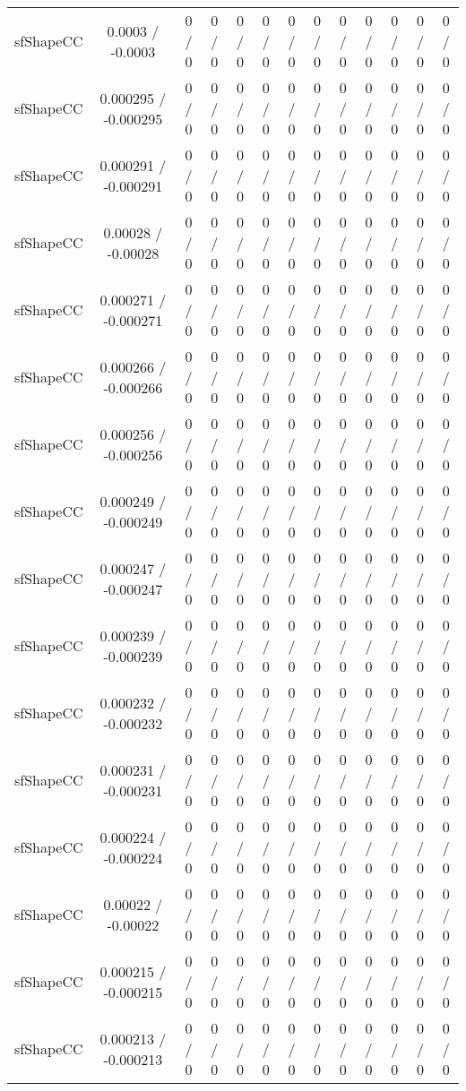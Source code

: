 \documentclass[10pt]{article}
\begin{document}
\begin{table}[htbp]
\begin{center}
\begin{tabular}{|c|c|c|c|c|c|c|c|c|c|c|c|c|}
  sfShapeCC & 0.0003 / -0.0003 & 0 / 0 & 0 / 0 & 0 / 0 & 0 / 0 & 0 / 0 & 0 / 0 & 0 / 0 & 0 / 0 & 0 / 0 & 0 / 0 & 0 / 0 \\ 
  sfShapeCC & 0.000295 / -0.000295 & 0 / 0 & 0 / 0 & 0 / 0 & 0 / 0 & 0 / 0 & 0 / 0 & 0 / 0 & 0 / 0 & 0 / 0 & 0 / 0 & 0 / 0 \\ 
  sfShapeCC & 0.000291 / -0.000291 & 0 / 0 & 0 / 0 & 0 / 0 & 0 / 0 & 0 / 0 & 0 / 0 & 0 / 0 & 0 / 0 & 0 / 0 & 0 / 0 & 0 / 0 \\ 
  sfShapeCC & 0.00028 / -0.00028 & 0 / 0 & 0 / 0 & 0 / 0 & 0 / 0 & 0 / 0 & 0 / 0 & 0 / 0 & 0 / 0 & 0 / 0 & 0 / 0 & 0 / 0 \\ 
  sfShapeCC & 0.000271 / -0.000271 & 0 / 0 & 0 / 0 & 0 / 0 & 0 / 0 & 0 / 0 & 0 / 0 & 0 / 0 & 0 / 0 & 0 / 0 & 0 / 0 & 0 / 0 \\ 
  sfShapeCC & 0.000266 / -0.000266 & 0 / 0 & 0 / 0 & 0 / 0 & 0 / 0 & 0 / 0 & 0 / 0 & 0 / 0 & 0 / 0 & 0 / 0 & 0 / 0 & 0 / 0 \\ 
  sfShapeCC & 0.000256 / -0.000256 & 0 / 0 & 0 / 0 & 0 / 0 & 0 / 0 & 0 / 0 & 0 / 0 & 0 / 0 & 0 / 0 & 0 / 0 & 0 / 0 & 0 / 0 \\ 
  sfShapeCC & 0.000249 / -0.000249 & 0 / 0 & 0 / 0 & 0 / 0 & 0 / 0 & 0 / 0 & 0 / 0 & 0 / 0 & 0 / 0 & 0 / 0 & 0 / 0 & 0 / 0 \\ 
  sfShapeCC & 0.000247 / -0.000247 & 0 / 0 & 0 / 0 & 0 / 0 & 0 / 0 & 0 / 0 & 0 / 0 & 0 / 0 & 0 / 0 & 0 / 0 & 0 / 0 & 0 / 0 \\ 
  sfShapeCC & 0.000239 / -0.000239 & 0 / 0 & 0 / 0 & 0 / 0 & 0 / 0 & 0 / 0 & 0 / 0 & 0 / 0 & 0 / 0 & 0 / 0 & 0 / 0 & 0 / 0 \\ 
  sfShapeCC & 0.000232 / -0.000232 & 0 / 0 & 0 / 0 & 0 / 0 & 0 / 0 & 0 / 0 & 0 / 0 & 0 / 0 & 0 / 0 & 0 / 0 & 0 / 0 & 0 / 0 \\ 
  sfShapeCC & 0.000231 / -0.000231 & 0 / 0 & 0 / 0 & 0 / 0 & 0 / 0 & 0 / 0 & 0 / 0 & 0 / 0 & 0 / 0 & 0 / 0 & 0 / 0 & 0 / 0 \\ 
  sfShapeCC & 0.000224 / -0.000224 & 0 / 0 & 0 / 0 & 0 / 0 & 0 / 0 & 0 / 0 & 0 / 0 & 0 / 0 & 0 / 0 & 0 / 0 & 0 / 0 & 0 / 0 \\ 
  sfShapeCC & 0.00022 / -0.00022 & 0 / 0 & 0 / 0 & 0 / 0 & 0 / 0 & 0 / 0 & 0 / 0 & 0 / 0 & 0 / 0 & 0 / 0 & 0 / 0 & 0 / 0 \\ 
  sfShapeCC & 0.000215 / -0.000215 & 0 / 0 & 0 / 0 & 0 / 0 & 0 / 0 & 0 / 0 & 0 / 0 & 0 / 0 & 0 / 0 & 0 / 0 & 0 / 0 & 0 / 0 \\ 
  sfShapeCC & 0.000213 / -0.000213 & 0 / 0 & 0 / 0 & 0 / 0 & 0 / 0 & 0 / 0 & 0 / 0 & 0 / 0 & 0 / 0 & 0 / 0 & 0 / 0 & 0 / 0 \\ 

\end{tabular}
\end{center}
\end{table}
\end{document}
